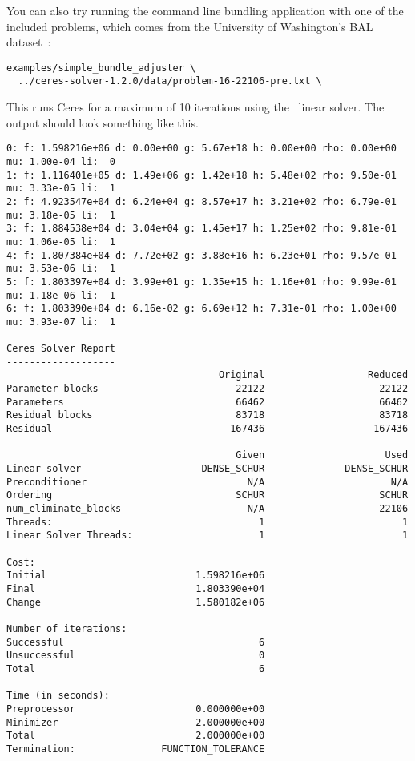 You can also try running the command line bundling application with one of the
included problems, which comes from the University of Washington's BAL dataset~\cite{Agarwal10bal}:
\begin{verbatim}
examples/simple_bundle_adjuster \
  ../ceres-solver-1.2.0/data/problem-16-22106-pre.txt \
\end{verbatim}
This runs Ceres for a maximum of 10 iterations using the  \denseschur\ linear solver. The output should look something like this.
\clearpage
\begin{verbatim}
0: f: 1.598216e+06 d: 0.00e+00 g: 5.67e+18 h: 0.00e+00 rho: 0.00e+00 mu: 1.00e-04 li:  0
1: f: 1.116401e+05 d: 1.49e+06 g: 1.42e+18 h: 5.48e+02 rho: 9.50e-01 mu: 3.33e-05 li:  1
2: f: 4.923547e+04 d: 6.24e+04 g: 8.57e+17 h: 3.21e+02 rho: 6.79e-01 mu: 3.18e-05 li:  1
3: f: 1.884538e+04 d: 3.04e+04 g: 1.45e+17 h: 1.25e+02 rho: 9.81e-01 mu: 1.06e-05 li:  1
4: f: 1.807384e+04 d: 7.72e+02 g: 3.88e+16 h: 6.23e+01 rho: 9.57e-01 mu: 3.53e-06 li:  1
5: f: 1.803397e+04 d: 3.99e+01 g: 1.35e+15 h: 1.16e+01 rho: 9.99e-01 mu: 1.18e-06 li:  1
6: f: 1.803390e+04 d: 6.16e-02 g: 6.69e+12 h: 7.31e-01 rho: 1.00e+00 mu: 3.93e-07 li:  1

Ceres Solver Report
-------------------
                                     Original                  Reduced
Parameter blocks                        22122                    22122
Parameters                              66462                    66462
Residual blocks                         83718                    83718
Residual                               167436                   167436

                                        Given                     Used
Linear solver                     DENSE_SCHUR              DENSE_SCHUR
Preconditioner                            N/A                      N/A
Ordering                                SCHUR                    SCHUR
num_eliminate_blocks                      N/A                    22106
Threads:                                    1                        1
Linear Solver Threads:                      1                        1

Cost:
Initial                          1.598216e+06
Final                            1.803390e+04
Change                           1.580182e+06

Number of iterations:
Successful                                  6
Unsuccessful                                0
Total                                       6

Time (in seconds):
Preprocessor                     0.000000e+00
Minimizer                        2.000000e+00
Total                            2.000000e+00
Termination:               FUNCTION_TOLERANCE
\end{verbatim}

